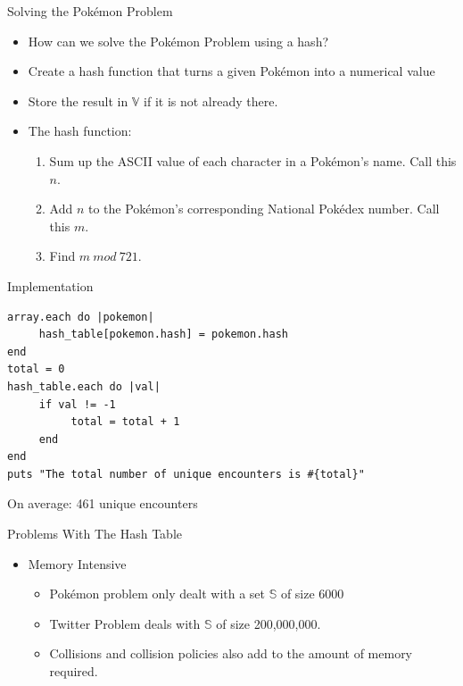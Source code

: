 \documentclass{beamer}
\begin{document}
\begin{frame}{Solving the Pok\'emon Problem}
\vspace{-2cm}
\begin{itemize}
\item How can we solve the Pok\'emon Problem using a hash?
\pause
\item Create a hash function that turns a given Pok\'emon into a numerical value
\pause
\item Store the result in $\mathbb{V}$ if it is not already there.
\pause
\item The hash function:
\begin{enumerate}
\item Sum up the ASCII value of each character in a Pok\'emon's name. Call this $n$.
\pause
\item Add $n$ to the Pok\'emon's corresponding National Pok\'edex number. Call this $m$.
\pause
\item Find $m\ mod\ 721$.
\end{enumerate}
\end{itemize}
\end{frame}

\begin{frame}[fragile]{Implementation}
\vspace{-2cm}
\begin{lstlisting}[basicstyle=\small]
array.each do |pokemon|
     hash_table[pokemon.hash] = pokemon.hash
end
total = 0
hash_table.each do |val|
     if val != -1
          total = total + 1
     end
end
puts "The total number of unique encounters is #{total}"
\end{lstlisting}
\pause
On average: 461 unique encounters
\end{frame}

\begin{frame}{Problems With The Hash Table}
\begin{itemize}
\item Memory Intensive
\begin{itemize}
\item Pok\'emon problem only dealt with a set $\mathbb{S}$ of size 6000
\pause
\item Twitter Problem deals with $\mathbb{S}$ of size 200,000,000.
\pause
\item Collisions and collision policies also add to the amount of memory required.
\end{itemize}
\end{itemize}
\end{frame}
\end{document}

